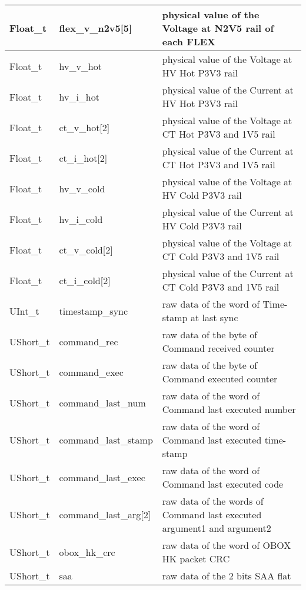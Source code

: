 \documentclass[a4paper, 12pt, onecolumn]{article}
\begin{document}
\begin{center}
\begin{supertabular}{| p{18mm} | p{38mm} | p{66mm} |}
    Float\_t    & flex\_v\_n2v5[5]         & physical value of the Voltage at N2V5 rail of each FLEX \\\hline
    Float\_t    & hv\_v\_hot               & physical value of the Voltage at HV Hot P3V3 rail \\\hline
    Float\_t    & hv\_i\_hot               & physical value of the Current at HV Hot P3V3 rail \\\hline
    Float\_t    & ct\_v\_hot[2]            & physical value of the Voltage at CT Hot P3V3 and 1V5 rail \\\hline
    Float\_t    & ct\_i\_hot[2]            & physical value of the Current at CT Hot P3V3 and 1V5 rail \\\hline
    Float\_t    & hv\_v\_cold              & physical value of the Voltage at HV Cold P3V3 rail \\\hline
    Float\_t    & hv\_i\_cold              & physical value of the Current at HV Cold P3V3 rail \\\hline
    Float\_t    & ct\_v\_cold[2]           & physical value of the Voltage at CT Cold P3V3 and 1V5 rail \\\hline
    Float\_t    & ct\_i\_cold[2]           & physical value of the Current at CT Cold P3V3 and 1V5 rail \\\hline
    UInt\_t     & timestamp\_sync          & raw data of the word of Time-stamp at last sync \\\hline
    UShort\_t   & command\_rec             & raw data of the byte of Command received counter \\\hline
    UShort\_t   & command\_exec            & raw data of the byte of Command executed counter \\\hline
    UShort\_t   & command\_last\_num       & raw data of the word of Command last executed number \\\hline
    UShort\_t   & command\_last\_stamp     & raw data of the word of Command last executed time-stamp \\\hline
    UShort\_t   & command\_last\_exec      & raw data of the word of Command last executed code \\\hline
    UShort\_t   & command\_last\_arg[2]    & raw data of the words of Command last executed argument1 and argument2 \\\hline
    UShort\_t   & obox\_hk\_crc            & raw data of the word of OBOX HK packet CRC \\\hline
    UShort\_t   & saa                      & raw data of the 2 bits SAA flat \\\hline

\end{supertabular}
\end{center}
\end{document}
